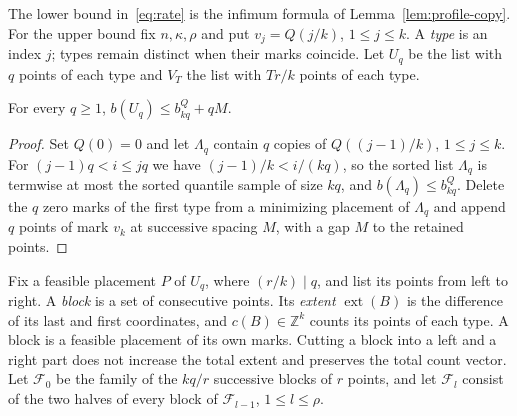 The lower bound in~\eqref{eq:rate} is the infimum formula of
Lemma~\ref{lem:profile-copy}. For the upper bound fix $n,\kappa,\rho$ and put
$v_j=Q(j/k)$, $1\le j\le k$. A \emph{type} is an index $j$; types remain
distinct when their marks coincide. Let $U_q$ be the list with $q$ points
of each type and $V_T$ the list with $Tr/k$ points of each type.

\begin{lemma}\label{lem:rate-types}
For every $q\ge1$, $b(U_q)\le b_{kq}^Q+qM$.
\end{lemma}
\begin{proof}
Set $Q(0)=0$ and let $\Lambda_q$ contain $q$ copies of $Q((j-1)/k)$,
$1\le j\le k$. For $(j-1)q<i\le jq$ we have $(j-1)/k<i/(kq)$, so the sorted
list $\Lambda_q$ is termwise at most the sorted quantile sample of size
$kq$, and $b(\Lambda_q)\le b_{kq}^Q$. Delete the $q$ zero marks of the
first type from a minimizing placement of $\Lambda_q$ and append $q$ points
of mark $v_k$ at successive spacing $M$, with a gap $M$ to the retained
points.
\end{proof}

Fix a feasible placement $P$ of $U_q$, where $(r/k)\mid q$, and list its
points from left to right. A \emph{block} is a set of consecutive points.
Its \emph{extent} $\operatorname{ext}(B)$ is the difference of its last and
first coordinates, and $c(B)\in\mathbb Z^k$ counts its points of each
type. A block is a feasible placement of its own marks. Cutting a block
into a left and a right part does not increase the total extent and
preserves the total count vector. Let $\mathcal F_0$ be the family of the
$kq/r$ successive blocks of $r$ points, and let $\mathcal F_l$ consist of
the two halves of every block of $\mathcal F_{l-1}$, $1\le l\le\rho$.

